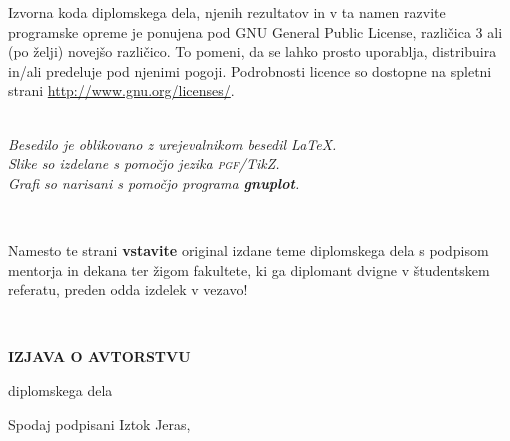 \documentclass[12pt,a4paper,openany]{book}
\newcommand{\gnuplot}{\textbf{gnuplot}}
\newcommand{\pgfname}{\textsc{pgf}}
\newcommand{\tikzname}{Ti\emph{k}Z}
\begin{document}
\vspace*{1.5cm}
{\small \noindent
Izvorna koda diplomskega dela, njenih rezultatov in v ta namen razvite programske opreme je ponujena pod GNU General Public License,
različica 3 ali (po želji) novejšo različico. To pomeni, da se lahko prosto uporablja, distribuira in/ali predeluje pod njenimi pogoji.
Podrobnosti licence so dostopne na spletni strani \url{http://www.gnu.org/licenses/}.
}

\begin{center} 
\ \\ \vfill
{\em
Besedilo je oblikovano z urejevalnikom besedil \LaTeX. \\ Slike so izdelane s pomočjo jezika \pgfname/\tikzname. \\ Grafi so narisani
s pomočjo programa \gnuplot.}
\end{center}

\newpage

\ \thispagestyle{empty}

\newpage


\thispagestyle{empty}

Namesto te strani {\bf vstavite} original izdane teme diplomskega dela s podpisom mentorja in dekana ter \v zigom fakultete, ki ga diplomant
dvigne v študent\-skem referatu,  preden odda izdelek v vezavo!

\newpage


\ \thispagestyle{empty}

\newpage



\thispagestyle{empty}

\vspace{1cm}
\begin{center} 
{\Large \textbf{IZJAVA O AVTORSTVU}}
\end{center}

\begin{center} 
{\Large diplomskega dela}
\end{center}

\vspace{1cm}
Spodaj podpisani \hspace{0.5cm} Iztok Jeras,
\end{document}
